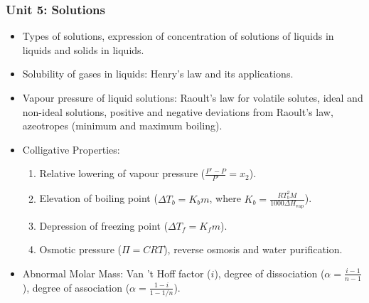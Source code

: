 \documentclass[11pt,a4paper]{article}
\begin{document}
\subsubsection{Unit 5: Solutions}
\begin{itemize}
  \item Types of solutions, expression of concentration of solutions of liquids in liquids and solids in liquids.
  \item Solubility of gases in liquids: Henry's law and its applications.
  \item Vapour pressure of liquid solutions: Raoult's law for volatile solutes, ideal and non-ideal solutions, positive and negative deviations from Raoult's law, azeotropes (minimum and maximum boiling).
  \item Colligative Properties:
  \begin{enumerate}
    \item Relative lowering of vapour pressure ($\frac{P^\circ - P}{P^\circ} = x_2$).
    \item Elevation of boiling point ($\Delta T_b = K_b m$, where $K_b = \frac{R T_b^2 M}{1000 \Delta H_{\text{vap}}}$).
    \item Depression of freezing point ($\Delta T_f = K_f m$).
    \item Osmotic pressure ($\Pi = CRT$), reverse osmosis and water purification.
  \end{enumerate}
  \item Abnormal Molar Mass: Van 't Hoff factor ($i$), degree of dissociation ($\alpha = \frac{i-1}{n-1}$), degree of association ($\alpha = \frac{1-i}{1 - 1/n}$).
\end{itemize}
\end{document}
